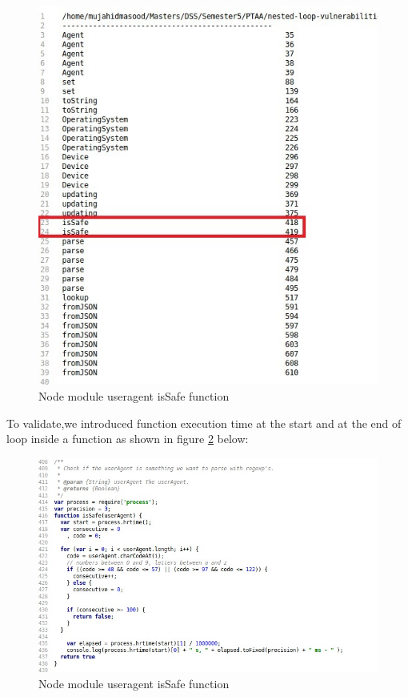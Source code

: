 \documentclass[authoryear,preprint]{sigplanconf}
\begin{document}
\begin{figure}[ht]
\centering
\includegraphics[width=0.8\linewidth]{figures/useragent-result}
\caption[Node module useragent isSafe function]{\label{f:result}Node module useragent isSafe function}
\end{figure}
To validate,we introduced function execution time at the start and at the end of loop inside a function as shown  in figure \ref{f:instumentation} below:
\begin{figure}[ht]
\centering
\includegraphics[width=1\linewidth]{figures/useragent-instumentation}
\caption[Node module useragent isSafe function]{\label{f:instumentation}Node module useragent isSafe function}
\end{figure}
\end{document}
